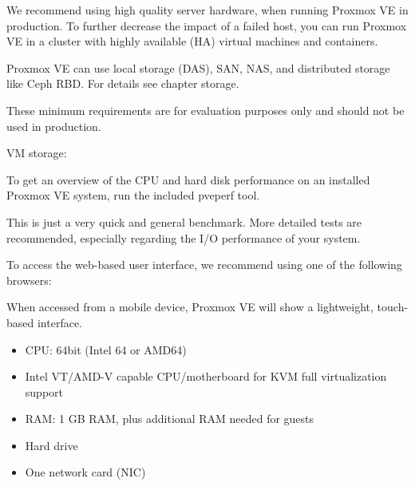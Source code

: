 We recommend using high quality server hardware, when running Proxmox VE in production. To further decrease the impact of a failed host, you can run Proxmox VE in a cluster with highly available (HA) virtual machines and containers.

Proxmox VE can use local storage (DAS), SAN, NAS, and distributed storage like Ceph RBD. For details see chapter storage.

These minimum requirements are for evaluation purposes only and should not be used in production.

VM storage:

To get an overview of the CPU and hard disk performance on an installed Proxmox VE system, run the included pveperf tool.

This is just a very quick and general benchmark. More detailed tests are recommended, especially regarding the I/O performance of your system.

To access the web-based user interface, we recommend using one of the following browsers:

When accessed from a mobile device, Proxmox VE will show a lightweight, touch-based interface.

\begin{itemize}[leftmargin=2cm]

	\item CPU: 64bit (Intel 64 or AMD64)

	\item Intel VT/AMD-V capable CPU/motherboard for KVM full virtualization support

	\item RAM: 1 GB RAM, plus additional RAM needed for guests

	\item Hard drive

	\item One network card (NIC)

\end{itemize}

